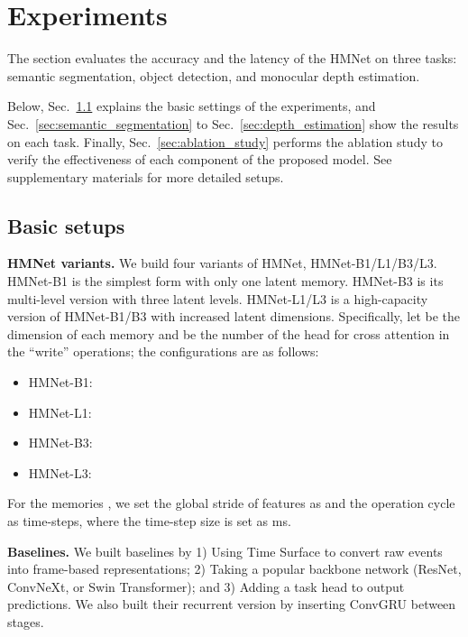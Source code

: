 \section{Experiments}
\label{sec:experiments}
The section evaluates the accuracy and the latency of the HMNet on three tasks: semantic segmentation, object detection, and monocular depth estimation.

Below, Sec.~\ref{sec:basic_setups} explains the basic settings of the experiments, and Sec.~\ref{sec:semantic_segmentation} to Sec.~\ref{sec:depth_estimation} show the results on each task.
Finally, Sec.~\ref{sec:ablation_study} performs the ablation study to verify the effectiveness of each component of the proposed model.
See supplementary materials for more detailed setups.

\figResutSemsegObjdet

\subsection{Basic setups}
\label{sec:basic_setups}

\noindent
\textbf{HMNet variants.}
We build four variants of HMNet, HMNet-B1/L1/B3/L3.
HMNet-B1 is the simplest form with only one latent memory. HMNet-B3 is its multi-level version with three latent levels. HMNet-L1/L3 is a high-capacity version of HMNet-B1/B3 with increased latent dimensions. Specifically, let  be the dimension of each memory and  be the number of the head for cross attention in the ``write'' operations; the configurations are as follows:
\begin{itemize}
\setlength{\parskip}{-1mm}
\setlength{\itemsep}{-3mm}
\item HMNet-B1:  \\
\item HMNet-L1:  \\
\item HMNet-B3:  \\
\item HMNet-L3:  \\
\end{itemize}
\vspace{-0.5cm}
For the memories , we set the global stride of features  as 
and the operation cycle as  time-steps, where the time-step size is set as ms.

\vspace{0.1cm}
\noindent
\textbf{Baselines.}
We built baselines by 1) Using Time Surface to convert raw events into frame-based representations; 2) Taking a popular backbone network (ResNet, ConvNeXt, or Swin Transformer); and 3) Adding a task head to output predictions.
We also built their recurrent version by inserting ConvGRU \cite{Ballas2016} between stages.


